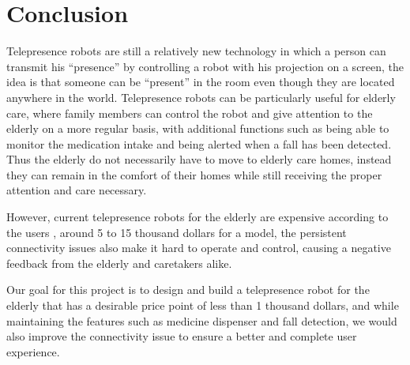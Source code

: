 \documentclass[12pt]{article}
\begin{document}
\section{Conclusion}
Telepresence robots are still a relatively new technology in which a person can transmit his “presence” by controlling a robot with his projection on a screen, the idea is that someone can be “present” in the room even though they are located anywhere in the world. Telepresence robots can be particularly useful for elderly care, where family members can control the robot and give attention to the elderly on a more regular basis, with additional functions such as being able to monitor the medication intake and being alerted when a fall has been detected. Thus the elderly do not necessarily have to move to elderly care homes, instead they can remain in the comfort of their homes while still receiving the proper attention and care necessary.\par
However, current telepresence robots for the elderly are expensive according to the users\cite{6} , around 5 to 15 thousand dollars for a model, the persistent connectivity issues also make it hard to operate and control, causing a negative feedback from the elderly and caretakers alike\cite{7}.\par
Our goal for this project is to design and build a telepresence robot for the elderly that has a desirable price point of less than 1 thousand dollars, and while maintaining the features such as medicine dispenser and fall detection, we would also improve the connectivity issue to ensure a better and complete user experience.
\newpage
\end{document}
